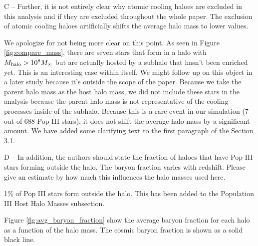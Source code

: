 \documentclass[11pt]{article}
\newenvironment{referee}[1][]{%
    \ignorespaces%
    \begin{mdframed}[style=myquotestyle,#1]%
}{%
    \end{mdframed}%
    \ignorespacesafterend%
}%
\begin{document}
\begin{referee}
C -- Further, it is not entirely clear why atomic cooling haloes are excluded in this analysis and if they are excluded throughout the whole paper. The exclusion of atomic cooling haloes artificially shifts the average halo mass to lower values.
\end{referee}

We apologize for not being more clear on this point.  As seen in Figure \ref{fig:compare_mass}, there are seven stars that form in a halo with $M_{\rm halo} > 10^8 M_\odot$ but are actually hosted by a subhalo that hasn't been enriched yet.  This is an interesting case within itself.  We might follow up on this object in a later study because it's outside the scope of the paper.  Because we take the parent halo mass as the host halo mass, we did not include these stars in the analysis because the parent halo mass is not representative of the cooling processes inside of the subhalo.  Because this is a rare event in our simulation (7 out of 688 Pop III stars), it does not shift the average halo mass by a significant amount.  We have added some clarifying text to the first paragraph of the Section 3.1.

\begin{referee}
D -- In addition, the authors should state the fraction of haloes that have Pop III stars forming outside the halo. The baryon fraction varies with redshift. Please give an estimate by how much this influences the halo masses used here.
\end{referee}

1\% of Pop III stars form outside the halo. This has been added to the Population III Host Halo Masses subsection. 

Figure \ref{fig:avg_baryon_fraction} show the average baryon fraction for each halo as a function of the halo mass. The cosmic baryon fraction is shown as a solid black line.
\end{document}
